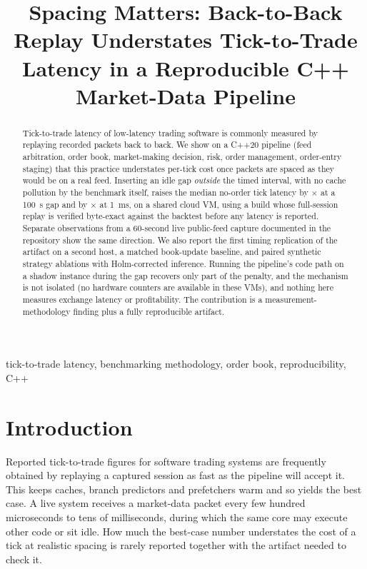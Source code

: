 \documentclass[conference]{IEEEtran}
\title{Spacing Matters: Back-to-Back Replay Understates Tick-to-Trade Latency in a Reproducible C++ Market-Data Pipeline}
\author{\IEEEauthorblockN{Rajvardhan Jadhav}\IEEEauthorblockA{Fox School of Business, Temple University\\Philadelphia, PA, USA}}
\begin{document}
\maketitle
\begin{abstract}
Tick-to-trade latency of low-latency trading software is commonly measured by replaying recorded packets back to back. We show on a C++20 pipeline (feed arbitration, order book, market-making decision, risk, order management, order-entry staging) that this practice understates per-tick cost once packets are spaced as they would be on a real feed. Inserting an idle gap \emph{outside} the timed interval, with no cache pollution by the benchmark itself, raises the median no-order tick latency by \SpacingHundredRatio$\times$ at a 100~\textmu s gap and by \SpacingOneMsRatio$\times$ at 1~ms, on a shared cloud VM, using a build whose full-session replay is verified byte-exact against the backtest before any latency is reported. Separate observations from a 60-second live public-feed capture documented in the repository show the same direction. We also report the first timing replication of the artifact on a second host, a matched book-update baseline, and paired synthetic strategy ablations with Holm-corrected inference. Running the pipeline's code path on a shadow instance during the gap recovers only part of the penalty, and the mechanism is not isolated (no hardware counters are available in these VMs), and nothing here measures exchange latency or profitability. The contribution is a measurement-methodology finding plus a fully reproducible artifact.
\end{abstract}
\begin{IEEEkeywords}tick-to-trade latency, benchmarking methodology, order book, reproducibility, C++\end{IEEEkeywords}

\section{Introduction}
Reported tick-to-trade figures for software trading systems are frequently obtained by replaying a captured session as fast as the pipeline will accept it. This keeps caches, branch predictors and prefetchers warm and so yields the best case. A live system receives a market-data packet every few hundred microseconds to tens of milliseconds, during which the same core may execute other code or sit idle. How much the best-case number understates the cost of a tick at realistic spacing is rarely reported together with the artifact needed to check it.
\end{document}
